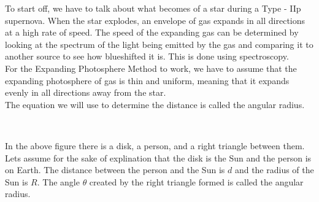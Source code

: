 To start off, we have to talk about what becomes of a star during a Type - IIp supernova.
When the star explodes, an envelope of gas expands in all directions at a high rate of speed.
The speed of the expanding gas can be determined by looking at the spectrum of the light being 
emitted by the gas and comparing it to another source to see how blueshifted it is. This is done 
using spectroscopy. 
\\
For the Expanding Photosphere Method to work, we have to assume that the expanding photosphere of gas 
is thin and uniform, meaning that it expands evenly in all directions away from the star.
\\
The equation we will use to determine the distance is called the angular radius.

\

In the above figure there is a disk, a person, and a right triangle between them.
Lets assume for the sake of explination that the disk is the Sun and the person is on Earth.
The distance between the person and the Sun is $d$ and the radius of the Sun is $R$.
The angle $\theta$ created by the right triangle formed is called the angular radius.
